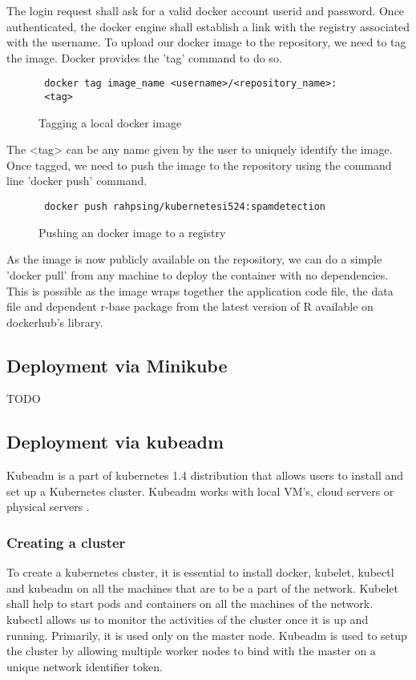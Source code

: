 \documentclass[9pt,twocolumn,twoside]{../../styles/osajnl}
\begin{document}
The login request shall ask for a valid docker account userid and
password. Once authenticated, the docker engine shall establish a link
with the registry associated with the username.  To upload our docker
image to the repository, we need to tag the image. Docker provides the
'tag' command to do so.

\begin{figure}[H]
\begin{verbatim}
 docker tag image_name <username>/<repository_name>:
 <tag>
\end{verbatim}
\caption{Tagging a local docker image}
\label{Tagging a local docker image}
\end{figure}


The <tag> can be any name given by the user to uniquely identify the
image. Once tagged, we need to push the image to the repository using
the command line 'docker push' command.

\begin{figure}[H]
\begin{verbatim}
 docker push rahpsing/kubernetesi524:spamdetection
\end{verbatim}
\caption{Pushing an docker image to a registry}
\label{Pushing an docker image to a registry}
\end{figure}

As the image is now publicly available on the repository, we can do a
simple 'docker pull' from any machine to deploy the container with no
dependencies. This is possible as the image wraps together the
application code file, the data file and dependent r-base package from
the latest version of R available on dockerhub's library.


\subsection{Deployment via Minikube}
TODO

\subsection{Deployment via kubeadm}

Kubeadm is a part of kubernetes 1.4 distribution that allows users to
install and set up a Kubernetes cluster. Kubeadm works with local
VM's, cloud servers or physical servers \cite{www-kubernetes-kubeadm}.

\subsubsection{Creating a cluster}
To create a kubernetes cluster, it is essential to install docker,
kubelet, kubectl and kubeadm on all the machines that are to be a part
of the network. Kubelet shall help to start pods and containers on all
the machines of the network.  kubectl allows us to monitor the
activities of the cluster once it is up and running. Primarily, it is
used only on the master node. Kubeadm is used to setup the cluster by
allowing multiple worker nodes to bind with the master on a unique
network identifier token.
\end{document}
